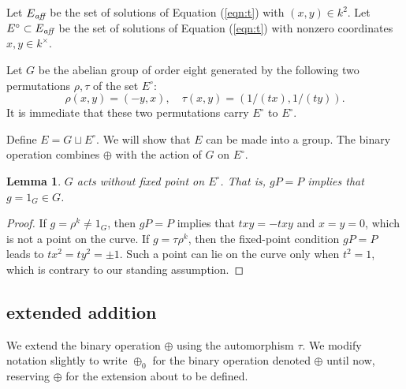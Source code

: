 \documentclass[12pt]{article}
\newtheorem{lemma}[theorem]{Lemma}
\newcommand{\op}[1]{\hbox{#1}}
\newcommand{\Eaff}{E_{\op{\scriptsize\it aff}}}
\newcommand{\Eoo}{E^{\circ}}
\newcommand{\Go}{\langle\rho\rangle}
\begin{document}
Let $\Eaff$ be the set of solutions of Equation (\ref{eqn:t}) with
$(x,y)\in k^2$.
Let $\Eoo\subset \Eaff$ be the set of solutions of Equation (\ref{eqn:t}) with
nonzero coordinates $x,y\in k^\times$.

Let $G$ be the abelian group of order eight generated by the following
two permutations $\rho,\tau$ of the set $\Eoo$:
\[
\rho(x,y) = (-y,x),\quad \tau(x,y) = (1/(tx),1/(ty)).
\]
It is immediate that these two permutations carry $\Eoo$ to $\Eoo$.

Define $E = G\sqcup \Eoo$.  We will show that $E$ can be made into a
group.  The binary operation 
combines $\oplus$ with the action of $G$ on $\Eoo$.



\begin{lemma}  \label{lemma:no-fix}
  $G$ acts without fixed point on $\Eoo$.  That is, $g P = P$ implies
  that $g=1_G\in G$.
\end{lemma}

\begin{proof} 
  If $g = \rho^k\ne 1_G$, then $g P = P$ implies that $t x y = - t x
  y$ and $x=y=0$, which is not a point on the curve.  If $g = \tau
  \rho^k$, then the fixed-point condition $g P = P$ leads to $t x^2 =
  t y^2 =\pm 1$.  Such a point can lie on the curve only when $t^2=1$,
  which is contrary to our standing assumption.
\end{proof}

\subsection{extended addition}

We extend the binary operation $\oplus$ using the automorphism $\tau$.
We modify notation slightly to write $\oplus_0$ for the binary
operation denoted $\oplus$ until now, reserving $\oplus$ for the
extension about to be defined.
\end{document}

